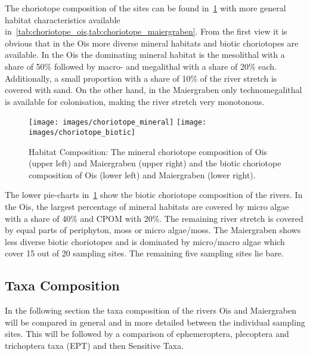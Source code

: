 The choriotope composition of the sites can be found in~\cref{fig:choriotope_composition} with more general habitat characteristics available in~\cref{tab:choriotope_ois,tab:choriotope_maiergraben}. From the first view it is obvious that in the Ois more diverse mineral habitats and biotic choriotopes are available. In the Ois the dominating mineral habitat is the mesolithal with a share of 50\% followed by macro- and megalithal with a share of 20\% each. Additionally, a small proportion with a share of 10\% of the river stretch is covered with sand. On the other hand, in the Maiergraben only technomegalithal is available for colonisation, making the river stretch very monotonous.


\begin{figure}[!htb]                               %
  \center
  \texttt{[image: images/choriotope\_mineral]}                 %
  \texttt{[image: images/choriotope\_biotic]}                 %
      \caption{Habitat Composition: The mineral choriotope composition of Ois (upper left) and Maiergraben (upper right) and the biotic choriotope composition of Ois (lower left) and Maiergraben (lower right).}      %
  \label{fig:choriotope_composition}                                                        %
\end{figure}


The lower pie-charts in~\cref{fig:choriotope_composition} show the biotic choriotope composition of the rivers. In the Ois, the largest percentage of mineral habitats are covered by micro algae with a share of 40\% and CPOM with 20\%. The remaining river stretch is covered by equal parts of periphyton, moss or micro algae/moss. The Maiergraben shows less diverse biotic choriotopes and is dominated by micro/macro algae which cover 15 out of 20 sampling sites. The remaining five sampling sites lie bare.



\subsection{Taxa Composition}\label{sec:taxa_composition_results}       %

In the following section the taxa composition of the rivers Ois and Maiergraben will be compared in general and in more detailed between the individual sampling sites. This will be followed by a comparison of ephemeroptera, plecoptera and trichoptera taxa (EPT) and then Sensitive Taxa.


